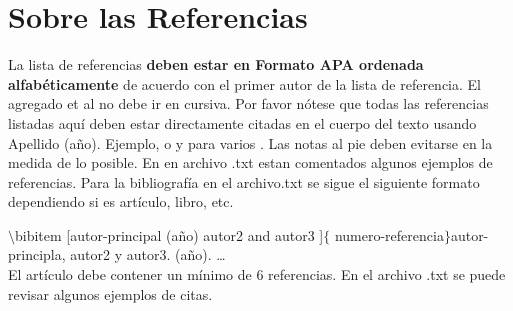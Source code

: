 \documentclass[10.5 pt, twocolumn]{article}
\begin{document}
\section{Sobre las Referencias}
La lista de referencias \textbf {deben estar en Formato APA ordenada alfabéticamente} de acuerdo con el primer autor de la lista de referencia. El agregado et al no debe ir en cursiva. Por favor nótese que todas las referencias listadas aquí deben estar directamente citadas en el cuerpo del texto usando Apellido (año). Ejemplo, \cite{chen1990linear} o \cite{trevino2016managing} y para varios \cite{Falconi2020, duchesne2018educational, sainaghi2008strategic, harrison2005development}. Las notas al pie deben evitarse en la medida de lo posible. En en archivo .txt estan comentados algunos ejemplos de referencias. Para la bibliografía en el archivo.txt se sigue el siguiente formato dependiendo si es artículo, libro, etc.

$\setminus$bibitem [autor-principal  (año) autor2 and autor3 ]$\lbrace$ numero-referencia$\rbrace$autor-principla, autor2 y autor3. (año). \dots \\

El artículo debe contener un mínimo de 6 referencias. En el archivo .txt se puede revisar algunos ejemplos de citas. 

\printbibliography[title={Referencias}]
\end{document}
